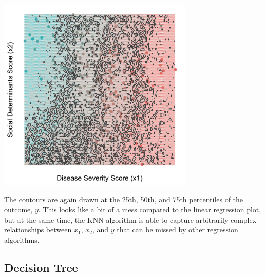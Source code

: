 \begin{center}
\includegraphics[width=0.7\textwidth]{img/esl-reg-knn-15.png}
\end{center}

\noindent The contours are again drawn at the 25th, 50th, and 75th percentiles of the outcome, $y$. This looks like a bit of a mess compared to the linear regression plot, but at the same time, the KNN algorithm is able to capture arbitrarily complex relationships between $x_1$, $x_2$, and $y$ that can be missed by other regression algorithms.  

\subsection{Decision Tree}

